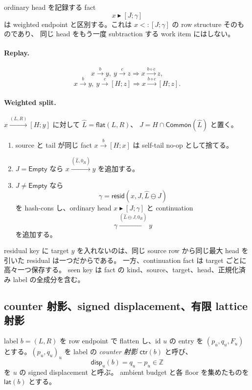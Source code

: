 \documentclass[uplatex,dvipdfmx,a4paper,10.5pt]{jsarticle}
\theoremstyle{jpplain}
\newcommand{\Empty}{\mathsf{Empty}}
\newcommand{\Common}{\mathsf{Common}}
\newcommand{\ctr}{\mathsf{ctr}}
\newcommand{\lat}{\mathsf{lat}}
\newcommand{\disp}{\mathsf{disp}}
\newcommand{\edge}[3]{#1\xrightarrow{#2}#3}
\newcommand{\epedge}[4]{#1\xrightarrow{#2}[#3;#4]}
\newcommand{\headfact}[3]{#1\mathrel{\blacktriangleright}[#2;#3]}
\newcommand{\rid}{\mathsf{resid}}
\begin{document}
ordinary head を記録する fact
\[
  \headfact{x}{J}{\gamma}
\]
は weighted endpoint と区別する。これは $x<:[J;\gamma]$ の row structure そのものであり、
同じ head をもう一度 subtraction する work item にはしない。

\paragraph{Replay.}
\[
  \edge{x}{b}{y},\ \edge{y}{c}{z}
  \Longrightarrow
  \edge{x}{b\diamond c}{z},
\]
\[
  \edge{x}{b}{y},\ \epedge{y}{c}{H}{z}
  \Longrightarrow
  \epedge{x}{b\diamond c}{H}{z}.
\]

\paragraph{Weighted split.}
$\epedge{x}{(L,R)}{H}{y}$ に対して $\widehat L=\mathsf{flat}(L,R)$、
$J=H\cap\Common(\widehat L)$ と置く。

\begin{enumerate}
  \item source と tail が同じ fact $\epedge{x}{b}{H}{x}$ は self-tail no-op として捨てる。
  \item $J=\Empty$ なら $\edge{x}{(\widehat L,0_R)}{y}$ を追加する。
  \item $J\neq\Empty$ なら
  \[
    \gamma=\rid(x,J,\widehat L\ominus J)
  \]
  を hash-cons し、ordinary head $\headfact{x}{J}{\gamma}$ と continuation
  \[
    \edge{\gamma}{(\widehat L\ominus J,0_R)}{y}
  \]
  を追加する。
\end{enumerate}

residual key に target $y$ を入れないのは、同じ source row から同じ最大 head を引いた residual は一つだからである。
一方、continuation fact は target ごとに高々一つ保存する。
seen key は fact の kind、source、target、head、正規化済み label の全成分を含む。

\subsection{counter 射影、signed displacement、有限 lattice 射影}

label $b=(L,R)$ を row endpoint で flatten し、id $u$ の entry を
$(p_u,q_u,F_u)$ とする。$(p_u,q_u)_u$ を label の
\emph{counter 射影} $\ctr(b)$ と呼び、
\[
  \disp_u(b)=q_u-p_u\in\mathbb Z
\]
を $u$ の signed displacement と呼ぶ。
ambient budget と各 floor を集めたものを $\lat(b)$ とする。
\end{document}
